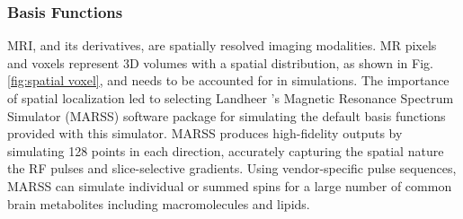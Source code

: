 




\subsubsection{Basis Functions}
MRI, and its derivatives, are spatially resolved imaging modalities. MR pixels and voxels represent 3D volumes with a spatial distribution, as shown in Fig. \ref{fig:spatial voxel}, and needs to be accounted for in simulations. The importance of spatial localization led to selecting Landheer \etal's Magnetic Resonance Spectrum Simulator (MARSS)\cite{Landheer2021} software package for simulating the default basis functions provided with this simulator. MARSS produces high-fidelity outputs by simulating 128 points in each direction, accurately capturing the spatial nature the RF pulses and slice-selective gradients. Using vendor-specific pulse sequences, MARSS can simulate individual or summed spins for a large number of common brain metabolites including macromolecules and lipids.%
 

 
 
